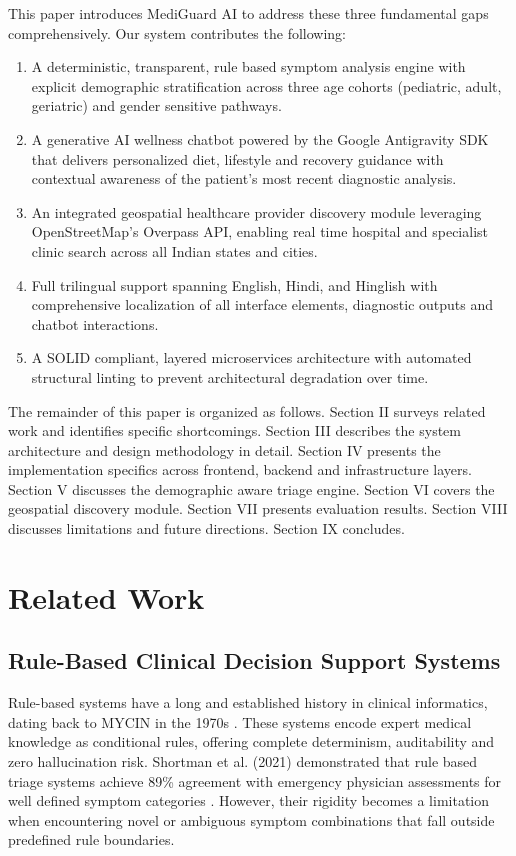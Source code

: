 \documentclass[conference]{IEEEtran}
\begin{document}
This paper introduces MediGuard AI to address these three fundamental gaps comprehensively. Our system contributes the following:

\begin{enumerate}
\item A deterministic, transparent, rule based symptom analysis engine with explicit demographic stratification across three age cohorts (pediatric, adult, geriatric) and gender sensitive pathways.
\item A generative AI wellness chatbot powered by the Google Antigravity SDK that delivers personalized diet, lifestyle and recovery guidance with contextual awareness of the patient's most recent diagnostic analysis.
\item An integrated geospatial healthcare provider discovery module leveraging OpenStreetMap's Overpass API, enabling real time hospital and specialist clinic search across all Indian states and cities.
\item Full trilingual support spanning English, Hindi, and Hinglish with comprehensive localization of all interface elements, diagnostic outputs and chatbot interactions.
\item A SOLID compliant, layered microservices architecture with automated structural linting to prevent architectural degradation over time.
\end{enumerate}

The remainder of this paper is organized as follows. Section II surveys related work and identifies specific shortcomings. Section III describes the system architecture and design methodology in detail. Section IV presents the implementation specifics across frontend, backend and infrastructure layers. Section V discusses the demographic aware triage engine. Section VI covers the geospatial discovery module. Section VII presents evaluation results. Section VIII discusses limitations and future directions. Section IX concludes.

\section{Related Work}

\subsection{Rule-Based Clinical Decision Support Systems}

Rule-based systems have a long and established history in clinical informatics, dating back to MYCIN in the 1970s \cite{b7}. These systems encode expert medical knowledge as conditional rules, offering complete determinism, auditability and zero hallucination risk. Shortman et al. (2021) demonstrated that rule based triage systems achieve 89\% agreement with emergency physician assessments for well defined symptom categories \cite{b8}. However, their rigidity becomes a limitation when encountering novel or ambiguous symptom combinations that fall outside predefined rule boundaries.
\end{document}
